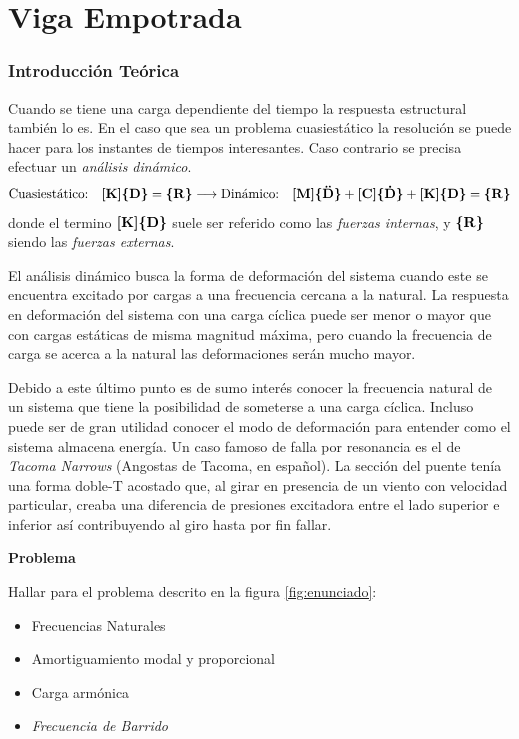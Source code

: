 \documentclass[onecolumn,10pt,titlepage,a4paper]{article}
\begin{document}
\tableofcontents
\part{Viga Empotrada}
\section{Introducción Teórica}
Cuando se tiene una carga dependiente del tiempo la respuesta estructural también lo es. En el caso que sea un problema cuasiestático la resolución se puede hacer para los instantes de tiempos interesantes. Caso contrario se precisa efectuar un \textit{análisis dinámico}.
\[
\text{Cuasiestático:}\quad \boldsymbol{[}\mathbf{K} \boldsymbol{]}\boldsymbol{\{ }\mathbf{D} \boldsymbol{\}} = \boldsymbol{\{ }\mathbf{R} \boldsymbol{\}} \longrightarrow \text{Dinámico:} \quad 
\boldsymbol{[}\mathbf{M} \boldsymbol{]} \boldsymbol{\{ }\mathbf{\ddot{D}} \boldsymbol{\}} + \boldsymbol{[}\mathbf{C} \boldsymbol{]}\boldsymbol{\{ }\mathbf{\dot{D}} \boldsymbol{\}} + \boldsymbol{[}\mathbf{K} \boldsymbol{]}\boldsymbol{\{ }\mathbf{D} \boldsymbol{\}} = \boldsymbol{\{ }\mathbf{R} \boldsymbol{\}}	
\]
donde el termino $\boldsymbol{[}\mathbf{K} \boldsymbol{]}\boldsymbol{\{ }\mathbf{D} \boldsymbol{\}}$ suele ser referido como las \textit{fuerzas internas}, y $\boldsymbol{\{ }\mathbf{R} \boldsymbol{\}}$ siendo las \textit{fuerzas externas}.

El análisis dinámico busca la forma de deformación del sistema cuando este se encuentra excitado por cargas a una frecuencia cercana a la natural. La respuesta en deformación del sistema con una carga cíclica puede ser menor o mayor que con cargas estáticas de misma magnitud máxima, pero cuando la frecuencia de carga se acerca a la natural las deformaciones serán mucho mayor. 

Debido a este último punto es de sumo interés conocer la frecuencia natural de un sistema que tiene la posibilidad de someterse a una carga cíclica. Incluso puede ser de gran utilidad conocer el modo de deformación para entender como el sistema almacena energía. Un caso famoso de falla por resonancia es el de \textit{Tacoma Narrows} (Angostas de Tacoma, en español). La sección del puente tenía una forma doble-T acostado que, al girar en presencia de un viento con velocidad particular, creaba una diferencia de presiones excitadora entre el lado superior e inferior así contribuyendo al giro hasta por fin fallar.

{\textbf{Problema}}\par
Hallar para el problema descrito en la figura \ref{fig:enunciado}:
\begin{itemize}
	\item Frecuencias Naturales
	\item Amortiguamiento modal y proporcional
	\item Carga armónica
	\item \textit{Frecuencia de Barrido}
\end{itemize}
\end{document}
